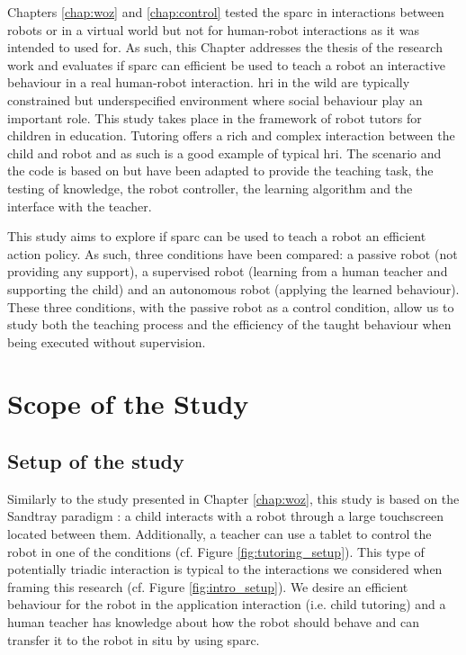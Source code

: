 Chapters \ref{chap:woz} and \ref{chap:control} tested the \gls{sparc} in interactions between robots or in a virtual world but not for human-robot interactions as it was intended to used for. As such, this Chapter addresses the thesis of the research work and evaluates if \gls{sparc} can efficient be used to teach a robot an interactive behaviour in a real human-robot interaction. \gls{hri} in the wild are typically constrained but underspecified environment where social behaviour play an important role. This study takes place in the framework of robot tutors for children in education. Tutoring offers a rich and complex interaction between the child and robot and as such is a good example of typical \gls{hri}. The scenario and the code is based on \cite{lemaignan2017free} but have been adapted to provide the teaching task, the testing of knowledge, the robot controller, the learning algorithm and the interface with the teacher.

This study aims to explore if \gls{sparc} can be used to teach a robot an efficient action policy. As such, three conditions have been compared: a passive robot (not providing any support), a supervised robot (learning from a human teacher and supporting the child) and an autonomous robot (applying the learned behaviour). These three conditions, with the passive robot as a control condition, allow us to study both the teaching process and the efficiency of the taught behaviour when being executed without supervision.

\section{Scope of the Study}
\subsection{Setup of the study}

Similarly to the study presented in Chapter \ref{chap:woz}, this study is based on the Sandtray paradigm
\citep{baxter2012touchscreen}: a child interacts with a robot through a large touchscreen located between them.
Additionally, a teacher can use a tablet to control the robot in one of the conditions (cf. Figure
\ref{fig:tutoring_setup}). This type of potentially triadic interaction is typical to the interactions we considered when framing this research (cf. Figure \ref{fig:intro_setup}). We desire an efficient behaviour for the robot in the application interaction (i.e. child tutoring) and a human teacher has knowledge about how the robot should behave and can transfer it to the robot in situ by using \gls{sparc}.

